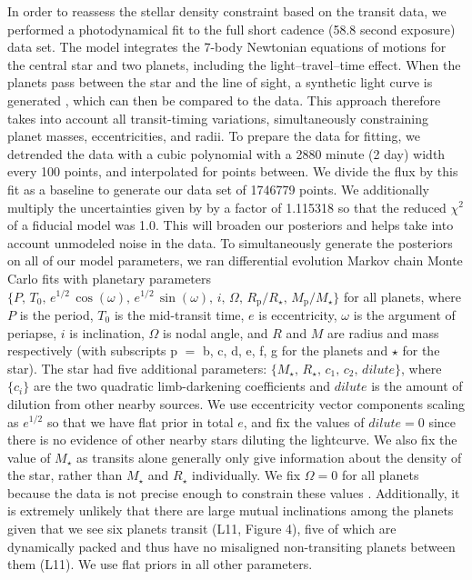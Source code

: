 \documentclass[oneside]{emulateapj}
\begin{document}
In order to reassess the stellar density constraint based on the transit data, we performed a photodynamical fit to the full \Kepler short cadence (58.8 second exposure) data set. The model integrates the 7-body Newtonian equations of motions for the central star and two planets, including the light--travel--time effect. When the planets pass between the star and the line of sight, a synthetic light curve is generated \citep{2012MNRAS.420.1630P}, which can then be compared to the data. This approach therefore takes into account all transit-timing variations, simultaneously constraining planet masses, eccentricities, and radii. To prepare the data for fitting, we detrended the data with a cubic polynomial with a 2880 minute (2 day) width every 100 points, and interpolated for points between. We divide the flux by this fit as a baseline to generate our data set of 1746779 points. We additionally multiply the uncertainties given by \Kepler by a factor of 1.115318 so that the reduced $\chi^2$ of a fiducial model was 1.0. This will broaden our posteriors and helps take into account unmodeled noise in the data. To simultaneously generate the posteriors on all of our model parameters, we ran differential evolution Markov chain Monte Carlo \cite[DEMCMC, ][]{TerBraak2005} fits with planetary parameters $\{P,\, T_0,\, e^{1/2} \, \cos(\omega),\, e^{1/2} \, \sin(\omega),\, i,\, \Omega,\, R_\mathrm{p}/R_\star,\, M_\mathrm{p}/M_\star\}$ for all planets, where $P$ is the period, $T_0$ is the mid-transit time, $e$ is eccentricity, $\omega$ is the argument of periapse, $i$ is inclination, $\Omega$ is nodal angle, and $R$ and $M$ are radius and mass respectively (with subscripts p $=$ b, c, d, e, f, g for the planets and $\star$ for the star). The star had five additional parameters: $\{M_\star,\, R_\star,\, c_1,\, c_2,\, dilute\}$, where $\{c_i\}$ are the two quadratic limb-darkening coefficients and $dilute$ is the amount of dilution from other nearby sources. We use eccentricity vector components scaling as $e^{1/2}$ so that we have flat prior in total $e$, and fix the values of $dilute=0$ since there is no evidence of other nearby stars diluting the lightcurve. We also fix the value of $M_\star$ as transits alone generally only give information about the density of the star, rather than $M_\star$ and $R_\star$ individually. We fix $\Omega = 0$ for all planets because the data is not precise enough to constrain these values \citep{Migaszewski2012}. Additionally, it is extremely unlikely that there are large mutual inclinations among the planets given that we see six planets transit (L11, Figure 4), five of which are dynamically packed and thus have no misaligned non-transiting planets between them (L11). We use flat priors in all other parameters.
\end{document}
